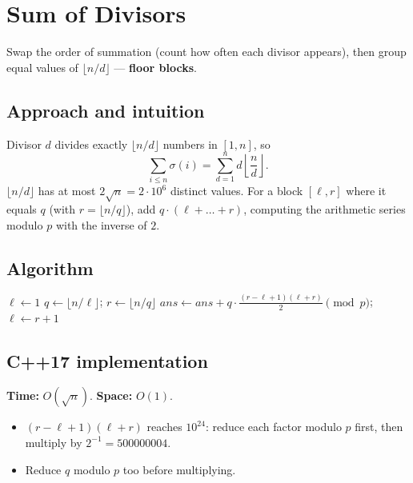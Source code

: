 \section{Sum of Divisors}
\label{sec:n-sum-div}


\begin{patternbox}
Swap the order of summation (count how often each divisor appears), then
group equal values of $\lfloor n/d\rfloor$ --- \textbf{floor blocks}.
\end{patternbox}

\subsection*{Approach and intuition}

Divisor $d$ divides exactly $\lfloor n/d\rfloor$ numbers in $[1,n]$, so
\[
  \sum_{i\le n}\sigma(i)=\sum_{d=1}^{n}d\left\lfloor\frac nd\right\rfloor .
\]
$\lfloor n/d\rfloor$ has at most $2\sqrt n=2\cdot10^6$ distinct values. For a
block $[\ell,r]$ where it equals $q$ (with $r=\lfloor n/q\rfloor$), add
$q\cdot(\ell+\dots+r)$, computing the arithmetic series modulo $p$ with the
inverse of $2$.

\subsection*{Algorithm}
\begin{algorithmic}[1]
\State $\ell\gets1$
  \State $q\gets\lfloor n/\ell\rfloor$; $r\gets\lfloor n/q\rfloor$
  \State $ans\gets ans+q\cdot\frac{(r-\ell+1)(\ell+r)}{2}\pmod p$; $\ell\gets r+1$
\EndWhile
\end{algorithmic}


\subsection*{C++17 implementation}

\begin{complexitybox}
\textbf{Time:} $O(\sqrt n)$. \textbf{Space:} $O(1)$.
\end{complexitybox}

\begin{pitfallbox}
\begin{itemize}
  \item $(r-\ell+1)(\ell+r)$ reaches $10^{24}$: reduce each factor modulo
        $p$ first, then multiply by $2^{-1}=500000004$.
  \item Reduce $q$ modulo $p$ too before multiplying.
\end{itemize}
\end{pitfallbox}
